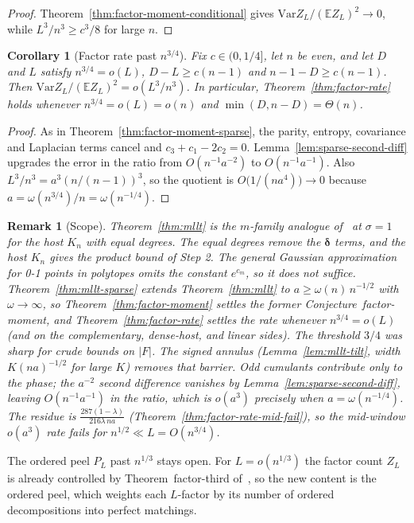\documentclass[11pt]{article}
\newtheorem{corollary}[theorem]{Corollary}
\newtheorem{remark}[theorem]{Remark}
\newcommand{\EE}{\mathbb{E}}
\newcommand{\Var}{\mathrm{Var}}
\begin{document}
\begin{proof}
Theorem~\ref{thm:factor-moment-conditional} gives \(\Var Z_L/(\EE Z_L)^2\to0\),
while \(L^3/n^3\ge c^3/8\) for large \(n\).
\end{proof}

\begin{corollary}[Factor rate past \(n^{3/4}\)]
\label{cor:factor-rate-sparse}
Fix \(c\in(0,1/4]\), let \(n\) be even, and let \(D\) and \(L\) satisfy
\(n^{3/4}=o(L)\), \(D-L\ge c(n-1)\) and \(n-1-D\ge c(n-1)\).
Then \(\Var Z_L/(\EE Z_L)^2=o(L^3/n^3)\).
In particular, Theorem~\ref{thm:factor-rate} holds whenever
\(n^{3/4}=o(L)=o(n)\) and \(\min(D,n-D)=\Theta(n)\).
\end{corollary}

\begin{proof}
As in Theorem~\ref{thm:factor-moment-sparse}, the parity, entropy, covariance
and Laplacian terms cancel and \(c_3+c_1-2c_2=0\).
Lemma~\ref{lem:sparse-second-diff} upgrades the error in the ratio from
\(O(n^{-1}a^{-2})\) to \(O(n^{-1}a^{-1})\).
Also \(L^3/n^3=a^3(n/(n-1))^3\), so the quotient is
\(O\bigl(1/(na^4)\bigr)\to0\) because \(a=\omega(n^{3/4})/n=\omega(n^{-1/4})\).
\end{proof}

\begin{remark}[Scope]
\label{rem:mllt-status}
Theorem~\ref{thm:mllt} is the \(m\)-family analogue
of~\cite[Theorem~1.2]{IM25} at \(\sigma=1\) for the host \(K_n\) with equal
degrees. The equal degrees remove the \(\boldsymbol\delta\) terms, and the
host \(K_n\) gives the product bound of Step 2.
The general Gaussian approximation for 0-1 points in polytopes omits the
constant \(e^{c_m}\), so it does not suffice.
Theorem~\ref{thm:mllt-sparse} extends Theorem~\ref{thm:mllt} to
\(a\ge\omega(n)\,n^{-1/2}\) with \(\omega\to\infty\), so
Theorem~\ref{thm:factor-moment} settles the former Conjecture~factor-moment, and
Theorem~\ref{thm:factor-rate} settles the rate whenever \(n^{3/4}=o(L)\) (and on
the complementary, dense-host, and linear sides).
The threshold \(3/4\) was sharp for crude bounds on \(|F|\). The signed
annulus (Lemma~\ref{lem:mllt-tilt}, width \(K(na)^{-1/2}\) for large \(K\))
removes that barrier. Odd cumulants contribute only to the phase; the
\(a^{-2}\) second difference vanishes by Lemma~\ref{lem:sparse-second-diff},
leaving \(O(n^{-1}a^{-1})\) in the ratio, which is \(o(a^3)\) precisely when
\(a=\omega(n^{-1/4})\).
The residue is \(\frac{287(1-\lambda)}{216\lambda\,na}\)
(Theorem~\ref{thm:factor-rate-mid-fail}), so the mid-window \(o(a^3)\) rate
fails for \(n^{1/2}\ll L=O(n^{3/4})\).
\end{remark}
The ordered peel \(P_L\) past \(n^{1/3}\) stays open.
For \(L=o(n^{1/3})\) the factor count \(Z_L\) is already controlled by
Theorem~factor-third of~\cite{PlusOneV1}, so the new content is the ordered
peel, which weights each \(L\)-factor by its number of ordered decompositions
into perfect matchings.
\end{document}
